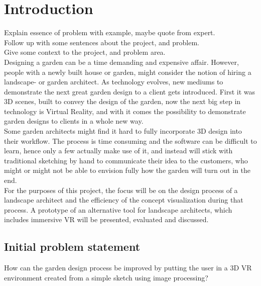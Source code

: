 \chapter{Introduction}
	
	Explain essence of problem with example, maybe quote from expert.\\
	Follow up with some sentences about the project, and problem.\\
	Give some context to the project, and problem area.\\
	
	Designing a garden can be a time demanding and expensive affair. However, people with a newly built house or garden, might consider the notion of hiring a landscape- or garden architect. As technology evolves, new mediums to demonstrate the next great garden design to a client gets introduced\cite{landscapeArchitectureDigiTech}. First it was 3D scenes, built to convey the design of the garden, now the next big step in technology is Virtual Reality\cite{VRS}, and with it comes the possibility to demonstrate garden designs to clients in a whole new way.\\
	
	Some garden architects might find it hard to fully incorporate 3D design into their workflow. The process is time consuming and the software can be difficult to learn, hence only a few actually make use of it, and instead will stick with traditional sketching by hand to communicate their idea to the customers, who might or might not be able to envision fully how the garden will turn out in the end.\\
	
	For the purposes of this project, the focus will be on the design process of a landscape architect and the efficiency of the concept visualization during that process. A prototype of an alternative tool for landscape architects, which includes immersive VR will be presented, evaluated and discussed.
	
	
	
	\section{Initial problem statement}
	How can the garden design process be improved by putting the user in a 3D VR environment created from a simple sketch using image processing?
	